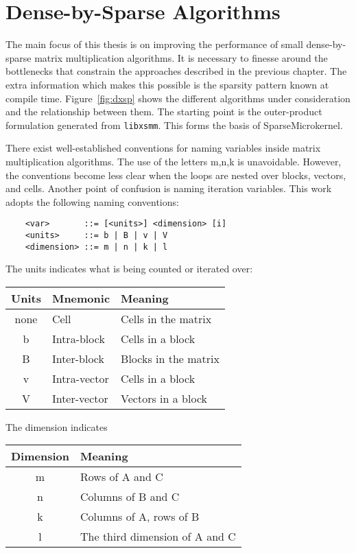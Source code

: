 \chapter{Dense-by-Sparse Algorithms}
\label{chapter:algs}

The main focus of this thesis is on improving the performance of small dense-by-sparse matrix multiplication algorithms. It is necessary to finesse around the bottlenecks that constrain the approaches described in the previous chapter. The extra information which makes this possible is the sparsity pattern known at compile time. Figure~\ref{fig:dxsp} shows the different algorithms under consideration and the relationship between them. The starting point is the outer-product formulation generated from \texttt{libxsmm}. This forms the basis of SparseMicrokernel. 

There exist well-established conventions for naming variables inside matrix multiplication algorithms. 
The use of the letters m,n,k is unavoidable. However, the conventions become less clear when the loops are nested over blocks, vectors, and cells.
Another point of confusion is naming iteration variables. This work adopts the following naming conventions:

  \begin{verbatim} 
    <var>       ::= [<units>] <dimension> [i]
    <units>     ::= b | B | v | V
    <dimension> ::= m | n | k | l
  \end{verbatim}
The units indicates what is being counted or iterated over:

    \begin{tabular}{cll}
\toprule
Units    & Mnemonic & Meaning \\
\midrule

none  & Cell          & Cells in the matrix      \\
b     & Intra-block   & Cells in a block         \\
B     & Inter-block   & Blocks in the matrix     \\
v     & Intra-vector  & Cells in a block         \\
V     & Inter-vector  & Vectors in a block       \\
\bottomrule
\end{tabular}

The dimension indicates 

\begin{tabular}{cl}
\toprule
Dimension    & Meaning \\
\midrule
m & Rows of A and C \\
n & Columns of B and C \\
k & Columns of A, rows of B \\
l & The third dimension of A and C\\
\bottomrule
\end{tabular}


